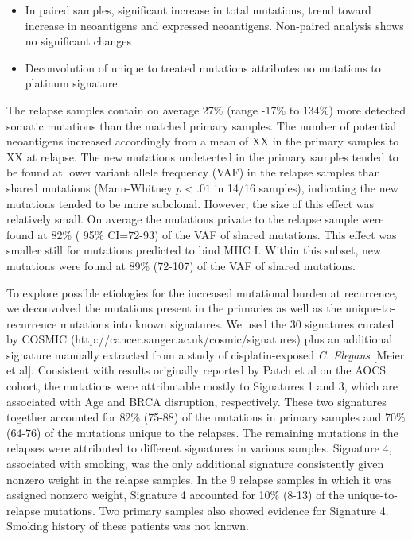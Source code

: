 \begin{itemize}
\item In paired samples, significant increase in total mutations, trend toward increase in neoantigens and expressed neoantigens. Non-paired analysis shows no significant changes
\item Deconvolution of unique to treated mutations attributes no mutations to platinum signature
\end{itemize}

The relapse samples contain on average 27\% (range -17\% to 134\%) more detected somatic mutations than the matched primary samples. The number of potential neoantigens increased accordingly from a mean of XX in the primary samples to XX at relapse. The new mutations undetected in the primary samples tended to be found at lower variant allele frequency (VAF) in the relapse samples than shared mutations (Mann-Whitney $p \lt .01$ in 14/16 samples), indicating the new mutations tended to be more subclonal. However, the size of this effect was relatively small. On average the mutations private to the relapse sample were found at 82\% ( 95\% CI=72-93) of the VAF of shared mutations. This effect was smaller still for mutations predicted to bind MHC I. Within this subset, new mutations were found at 89\% (72-107) of the VAF of shared mutations.

To explore possible etiologies for the increased mutational burden at recurrence, we deconvolved the mutations present in the primaries as well as the unique-to-recurrence mutations into known signatures. We used the 30 signatures curated by COSMIC (http://cancer.sanger.ac.uk/cosmic/signatures) plus an additional signature manually extracted from a study of cisplatin-exposed \textit{C. Elegans} [Meier et al]. Consistent with results originally reported by Patch et al on the AOCS cohort, the mutations were attributable mostly to Signatures 1 and 3, which are associated with Age and BRCA disruption, respectively. These two signatures together accounted for 82\% (75-88) of the mutations in primary samples and 70\% (64-76) of the mutations unique to the relapses. The remaining mutations in the relapses were attributed to different signatures in various samples. Signature 4, associated with smoking, was the only additional signature consistently given nonzero weight in the relapse samples. In the 9 relapse samples in which it was assigned nonzero weight, Signature 4 accounted for 10\% (8-13) of the unique-to-relapse mutations. Two primary samples also showed evidence for Signature 4. Smoking history of these patients was not known.

